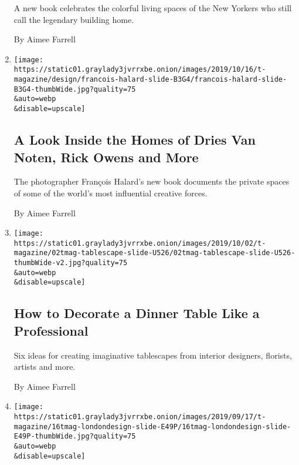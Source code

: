 \begin{enumerate}
  A new book celebrates the colorful living spaces of the New Yorkers
  who still call the legendary building home.

  By Aimee Farrell
\item
  \href{/2019/10/17/t-magazine/francois-halard.html}{}

  \texttt{[image: https://static01.graylady3jvrrxbe.onion/images/2019/10/16/t-magazine/design/francois-halard-slide-B3G4/francois-halard-slide-B3G4-thumbWide.jpg?quality=75\\\&auto=webp\\\&disable=upscale]}

  \hypertarget{a-look-inside-the-homes-of-dries-van-noten-rick-owens-and-more}{%
  \subsection{A Look Inside the Homes of Dries Van Noten, Rick Owens and
  More}\label{a-look-inside-the-homes-of-dries-van-noten-rick-owens-and-more}}

  The photographer François Halard's new book documents the private
  spaces of some of the world's most influential creative forces.

  By Aimee Farrell
\item
  \href{/2019/10/08/t-magazine/table-setting-guide.html}{}

  \texttt{[image: https://static01.graylady3jvrrxbe.onion/images/2019/10/02/t-magazine/02tmag-tablescape-slide-U526/02tmag-tablescape-slide-U526-thumbWide-v2.jpg?quality=75\\\&auto=webp\\\&disable=upscale]}

  \hypertarget{how-to-decorate-a-dinner-table-like-a-professional}{%
  \subsection{How to Decorate a Dinner Table Like a
  Professional}\label{how-to-decorate-a-dinner-table-like-a-professional}}

  Six ideas for creating imaginative tablescapes from interior
  designers, florists, artists and more.

  By Aimee Farrell
\item
  \href{/2019/09/18/t-magazine/london-design-festival.html}{}

  \texttt{[image: https://static01.graylady3jvrrxbe.onion/images/2019/09/17/t-magazine/16tmag-londondesign-slide-E49P/16tmag-londondesign-slide-E49P-thumbWide.jpg?quality=75\\\&auto=webp\\\&disable=upscale]}

  \hypertarget{eight-great-things-to-see-at-the-london-design-festival}{%
}
\end{enumerate}
